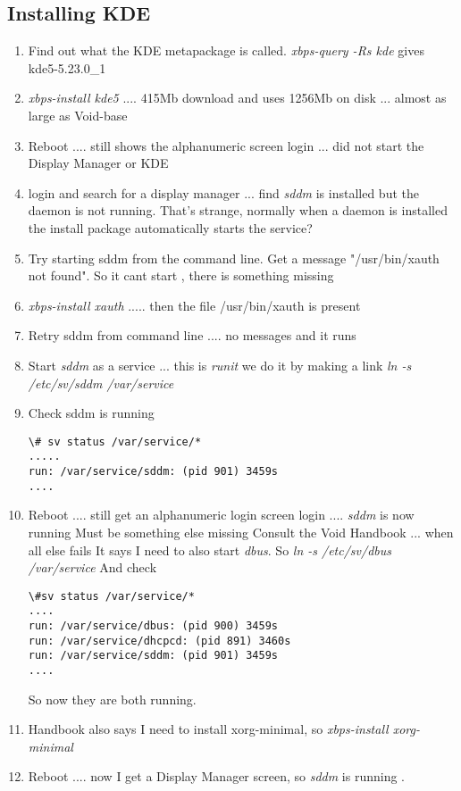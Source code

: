 \documentclass{article}  %
\begin{document}
\subsection{Installing KDE}
\begin{enumerate}
\item Find out what the KDE metapackage is called. 
{\em xbps-query -Rs kde}
gives kde5-5.23.0\_1
\item {\em xbps-install kde5} .... 415Mb download and uses 1256Mb on disk  ... almost as large as Void-base
\item Reboot  .... still shows the alphanumeric screen login  ... did not start the Display Manager or KDE
\item login and search for a display manager ... find {\em sddm}  is installed but the daemon is not running. That's strange, normally when a daemon is installed the install package automatically starts the service?
\item Try starting sddm from the command line. Get a message
"/usr/bin/xauth not found".
So it cant start , there is something missing
\item {\em xbps-install xauth} .....   then the file /usr/bin/xauth is present
\item Retry sddm from command line .... no messages and it runs
\item Start {\em sddm} as a service ... this is {\em runit} we do it by making a link
{\em ln -s /etc/sv/sddm /var/service}
\item Check sddm is running
\begin{verbatim}
\# sv status /var/service/*
.....
run: /var/service/sddm: (pid 901) 3459s
....
\end{verbatim}
\item Reboot .... still get an alphanumeric login screen
login .... {\em sddm} is now running
Must be something else missing
Consult the Void Handbook ... when all else fails
It says I need to also start {\em dbus}. So
{\em ln -s /etc/sv/dbus /var/service}
And check
\begin{verbatim}
\#sv status /var/service/*
....
run: /var/service/dbus: (pid 900) 3459s
run: /var/service/dhcpcd: (pid 891) 3460s
run: /var/service/sddm: (pid 901) 3459s
....
\end{verbatim}
So now they are both running.
\item Handbook also says I need to install xorg-minimal, so
{\em xbps-install xorg-minimal}
\item Reboot .... now I get a Display Manager screen, so {\em sddm} is running .

\end{enumerate}
\end{document}
